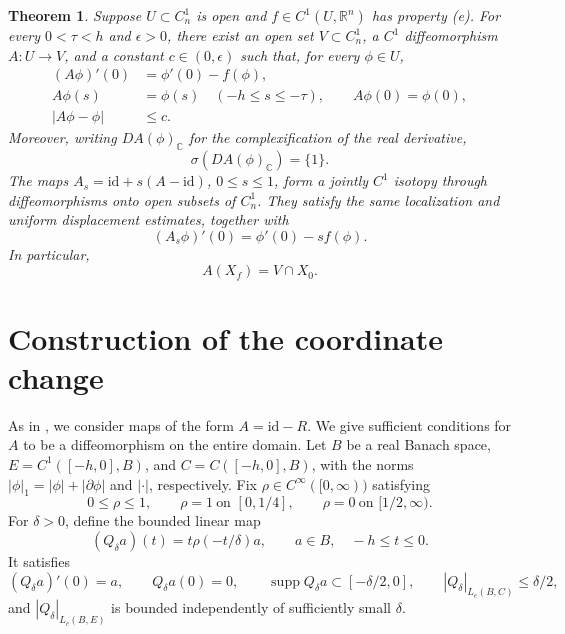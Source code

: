 \documentclass[11pt]{article}
\newtheorem{theorem}{Theorem}[section]
\newcommand{\Lc}{L_c}
\newcommand{\id}{\mathrm{id}}
\newcommand{\supp}{\operatorname{supp}}
\begin{document}
\begin{theorem}\label{thm:main}
Suppose $U\subset C_n^1$ is open and
$f\in C^1(U,\mathbb R^n)$ has property \textup{(e)}.
For every $0<\tau<h$ and $\epsilon>0$, there exist
an open set $V\subset C_n^1$, a $C^1$ diffeomorphism
$A:U\to V$, and a constant $c\in(0,\epsilon)$
such that, for every $\phi\in U$,
\begin{align}
(A\phi)'(0)&=\phi'(0)-f(\phi),
\label{eq:main-defect}\\
A\phi(s)&=\phi(s)\quad(-h\le s\le-\tau),
\qquad A\phi(0)=\phi(0),
\label{eq:main-local}\\
|A\phi-\phi|&\le c.
\label{eq:main-small}
\end{align}
Moreover, writing $DA(\phi)_{\mathbb C}$ for the
complexification of the real derivative,
\begin{equation}\label{eq:main-spectrum}
\sigma(DA(\phi)_{\mathbb C})=\{1\}.
\end{equation}
The maps $A_s=\id+s(A-\id)$, $0\le s\le1$,
form a jointly $C^1$ isotopy through
diffeomorphisms onto open subsets of $C_n^1$.
They satisfy the same localization and uniform
displacement estimates, together with
\[
(A_s\phi)'(0)=\phi'(0)-sf(\phi).
\]
In particular,
\begin{equation}\label{eq:main-manifold}
A(X_f)=V\cap X_0.
\end{equation}
\end{theorem}


\section{Construction of the coordinate change}

As in \cite{Walther2026}, we consider maps of the form
$A=\id-R$. We give sufficient conditions for $A$ to
be a diffeomorphism on the entire domain. Let $B$
be a real Banach space, $E=C^1([-h,0],B)$, and
$C=C([-h,0],B)$, with the norms
$|\phi|_1=|\phi|+|\partial\phi|$ and $|\cdot|$,
respectively. Fix $\rho\in C^\infty([0,\infty))$
satisfying
\[
 0\le\rho\le1,\qquad
 \rho=1\ \text{on }[0,1/4],
 \qquad
 \rho=0\ \text{on }[1/2,\infty).
\]
For $\delta>0$, define the bounded linear map
\begin{equation}\label{eq:Qdelta}
 (Q_\delta a)(t)=t\rho(-t/\delta)a,
 \qquad a\in B,\quad -h\le t\le0.
\end{equation}
It satisfies
\begin{equation}\label{eq:Qproperties}
 (Q_\delta a)'(0)=a,\qquad Q_\delta a(0)=0,
 \qquad
 \supp Q_\delta a\subset[-\delta/2,0],
 \qquad
 |Q_\delta|_{\Lc(B,C)}\le\delta/2,
\end{equation}
and $|Q_\delta|_{\Lc(B,E)}$ is bounded independently
of sufficiently small $\delta$.
\end{document}
